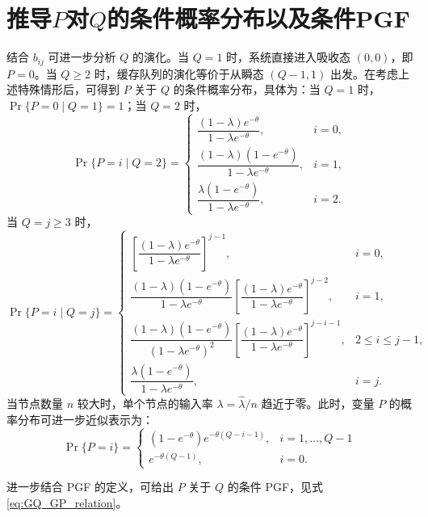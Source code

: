 \section[推导P对Q的条件概率分布以及条件PGF]{推导$P$对$Q$的条件概率分布以及条件PGF}
结合 $b_{ij}$ 可进一步分析 $Q$ 的演化。当 $Q=1$ 时，系统直接进入吸收态 $(0,0)$，即 $P=0$。当 $Q\ge 2$ 时，缓存队列的演化等价于从瞬态 $(Q-1,1)$ 出发。在考虑上述特殊情形后，可得到 $P$ 关于 $Q$ 的条件概率分布，具体为：当 $Q=1$ 时，$\Pr\{P=0 \mid Q=1\}=1$；当 $Q=2$ 时，
\begin{equation}
\Pr\{P=i \mid Q=2\}=\begin{cases}
\dfrac{(1-\lambda)e^{-\theta}}{1-\lambda e^{-\theta}}, & i=0,\\
\dfrac{(1-\lambda)(1-e^{-\theta})}{1-\lambda e^{-\theta}}, & i=1,\\
\dfrac{\lambda(1-e^{-\theta})}{1-\lambda e^{-\theta}}, & i=2.
\end{cases}
\label{eq:Pr_P_Q2_general}
\end{equation}
当 $Q=j\ge 3$ 时，
\begin{equation}
\Pr\{P=i \mid Q=j\}=\begin{cases}
\left[\dfrac{(1-\lambda)e^{-\theta}}{1-\lambda e^{-\theta}}\right]^{j-1}, & i=0,\\
\dfrac{(1-\lambda)(1-e^{-\theta})}{1-\lambda e^{-\theta}}\left[\dfrac{(1-\lambda)e^{-\theta}}{1-\lambda e^{-\theta}}\right]^{j-2}, & i=1,\\
\dfrac{(1-\lambda)(1-e^{-\theta})}{(1-\lambda e^{-\theta})^2}\left[\dfrac{(1-\lambda)e^{-\theta}}{1-\lambda e^{-\theta}}\right]^{j-i-1}, & 2\le i\le j-1,\\
\dfrac{\lambda(1-e^{-\theta})}{1-\lambda e^{-\theta}}, & i=j.
\end{cases}
\label{eq:Pr_P_Q3plus_general}
\end{equation}
当节点数量 $n$ 较大时，单个节点的输入率 $\lambda = \hat{\lambda}/n$ 趋近于零。此时，变量 $P$ 的概率分布可进一步近似表示为：
\begin{equation}
\operatorname{Pr}\{P=i\}=
\begin{cases}
\left(1-e^{-\theta}\right) e^{-\theta(Q-i-1)}, & i=1,\ldots, Q-1 \\
e^{-\theta(Q-1)}, & i=0.
\end{cases}
\end{equation}

进一步结合 PGF 的定义，可给出 $P$ 关于 $Q$ 的条件 PGF，见式 \eqref{eq:GQ_GP_relation}。